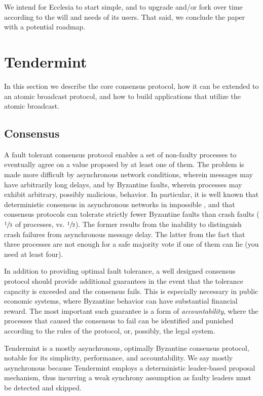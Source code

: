 \documentclass[12pt]{article}
\begin{document}
We intend for Ecclesia to start simple, and to upgrade and/or fork over time 
according to the will and needs of its users.
That said, we conclude the paper with a potential roadmap.

\section{Tendermint}

In this section we describe the core consensus protocol,
how it can be extended to an atomic broadcast protocol,
and how to build applications that utilize the atomic broadcast.

\subsection{Consensus}

A fault tolerant consensus protocol enables a set of non-faulty processes
to eventually agree on a value proposed by at least one of them.
The problem is made more difficult by asynchronous network conditions,
wherein messages may have arbitrarily long delays, and by Byzantine faults,
wherein processes may exhibit arbitrary, possibly malicious, behavior.
In particular, it is well known that deterministic consensus in asynchronous networks in impossible \cite{flp},
and that consensus protocols can tolerate strictly fewer Byzantine faults than crash faults 
($\sfrac{1}{3}$ of processes, vs. $\sfrac{1}{2}$).
The former results from the inability to distinguish crash failures from asynchronous message delay.
The latter from the fact that three processes are not enough for a safe majority vote if one of them can lie (you need at least four).

In addition to providing optimal fault tolerance, a well designed consensus protocol
should provide additional guarantees in the event that the tolerance capacity is exceeded and the
consensus fails. This is especially necessary in public economic systems, 
where Byzantine behavior can have substantial financial reward. 
The most important such guarantee is a form of \emph{accountability},
where the processes that caused the consensus to fail can be identified and punished according to the rules of the protocol, or, possibly, the legal system.

Tendermint is a mostly asynchronous, optimally Byzantine consensus protocol, notable for its simplicity, performance, and accountability. We say mostly asynchronous because Tendermint employs a deterministic leader-based proposal mechanism,
thus incurring a weak synchrony assumption as faulty leaders must be detected and skipped.
\end{document}
